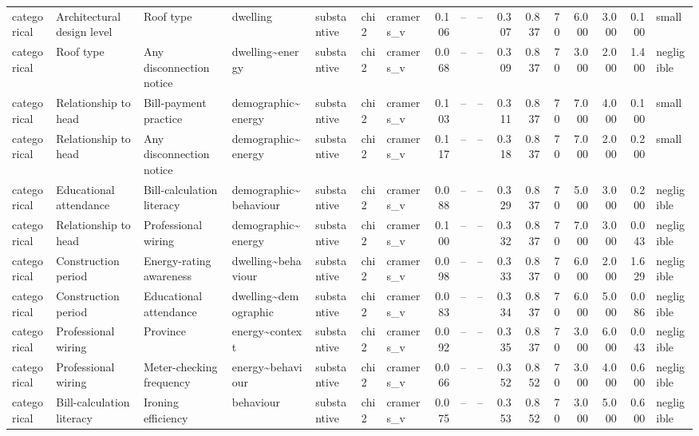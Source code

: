 \begin{table}
\begin{tabular}{lllllllrrrrrrrrrl}
categorical & Architectural design level & Roof type & dwelling & substantive & chi2 & cramers\_v & 0.106 & -- & -- & 0.307 & 0.837 & 70 & 6.000 & 3.000 & 0.100 & small \\
categorical & Roof type & Any disconnection notice & dwelling\textasciitilde energy & substantive & chi2 & cramers\_v & 0.068 & -- & -- & 0.309 & 0.837 & 70 & 3.000 & 2.000 & 1.400 & negligible \\
categorical & Relationship to head & Bill-payment practice & demographic\textasciitilde energy & substantive & chi2 & cramers\_v & 0.103 & -- & -- & 0.311 & 0.837 & 70 & 7.000 & 4.000 & 0.100 & small \\
categorical & Relationship to head & Any disconnection notice & demographic\textasciitilde energy & substantive & chi2 & cramers\_v & 0.117 & -- & -- & 0.318 & 0.837 & 70 & 7.000 & 2.000 & 0.200 & small \\
categorical & Educational attendance & Bill-calculation literacy & demographic\textasciitilde behaviour & substantive & chi2 & cramers\_v & 0.088 & -- & -- & 0.329 & 0.837 & 70 & 5.000 & 3.000 & 0.200 & negligible \\
categorical & Relationship to head & Professional wiring & demographic\textasciitilde energy & substantive & chi2 & cramers\_v & 0.100 & -- & -- & 0.332 & 0.837 & 70 & 7.000 & 3.000 & 0.043 & negligible \\
categorical & Construction period & Energy-rating awareness & dwelling\textasciitilde behaviour & substantive & chi2 & cramers\_v & 0.098 & -- & -- & 0.333 & 0.837 & 70 & 6.000 & 2.000 & 1.629 & negligible \\
categorical & Construction period & Educational attendance & dwelling\textasciitilde demographic & substantive & chi2 & cramers\_v & 0.083 & -- & -- & 0.334 & 0.837 & 70 & 6.000 & 5.000 & 0.086 & negligible \\
categorical & Professional wiring & Province & energy\textasciitilde context & substantive & chi2 & cramers\_v & 0.092 & -- & -- & 0.335 & 0.837 & 70 & 3.000 & 6.000 & 0.043 & negligible \\
categorical & Professional wiring & Meter-checking frequency & energy\textasciitilde behaviour & substantive & chi2 & cramers\_v & 0.066 & -- & -- & 0.352 & 0.852 & 70 & 3.000 & 4.000 & 0.600 & negligible \\
categorical & Bill-calculation literacy & Ironing efficiency & behaviour & substantive & chi2 & cramers\_v & 0.075 & -- & -- & 0.353 & 0.852 & 70 & 3.000 & 5.000 & 0.600 & negligible \\

\end{tabular}
\end{table}
